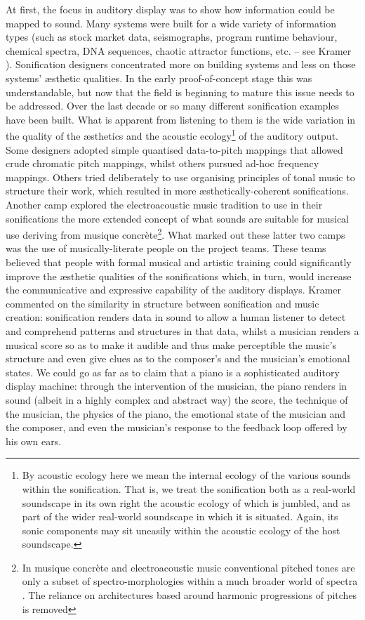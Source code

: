 \documentclass{article}
\begin{document}
At first, the focus in auditory display was to show how information could be mapped to sound. Many systems were built for a wide variety of information types (such as stock market data, seismographs, program runtime behaviour, chemical spectra, DNA sequences, chaotic attractor functions, etc. -- see Kramer \cite{Kramer:1994c}). Sonification designers concentrated more on building systems and less on those systems' æsthetic qualities. In the early proof-of-concept stage this was understandable, but now that the field is beginning to mature this issue needs to be addressed. Over the last decade or so many different sonification examples have been built. What is apparent from listening to them is the wide variation in the quality of the æsthetics and the acoustic ecology\footnote{By acoustic ecology here we mean the internal ecology of the various sounds within the sonification. That is, we treat the sonification both as a real-world soundscape in its own right the acoustic ecology of which is jumbled, and as part of the wider real-world soundscape in which it is situated. Again, its sonic components may sit uneasily within the acoustic ecology of the host soundscape.} of the auditory output. Some designers adopted simple quantised data-to-pitch mappings that allowed crude chromatic pitch mappings, whilst others pursued ad-hoc frequency mappings. Others tried deliberately to use organising principles of tonal music to structure their work, which resulted in more æsthetically-coherent sonifications. Another camp explored the electroacoustic music tradition to use in their sonifications the more extended concept of what sounds are suitable for musical use deriving from musique concrète\footnote{In musique concrète and electroacoustic music conventional pitched tones are only a subset of spectro-morphologies within a much broader world of spectra \cite{Smalley:1986}. The reliance on architectures based around harmonic progressions of pitches is removed}. What marked out these latter two camps was the use of musically-literate people on the project teams. These teams believed that people with formal musical and artistic training could significantly improve the æsthetic qualities of the sonifications which, in turn, would increase the communicative and expressive capability of the auditory displays. Kramer \cite{Kramer:1994b} commented on the similarity in structure between sonification and music creation: sonification renders data in sound to allow a human listener to detect and comprehend patterns and structures in that data, whilst a musician renders a musical score so as to make it audible and thus make perceptible the music's structure and even give clues as to the composer's and the musician's emotional states. We could go as far as to claim that a piano is a sophisticated auditory display machine: through the intervention of the musician, the piano renders in sound (albeit in a highly complex and abstract way) the score, the technique of the musician, the physics of the piano, the emotional state of the musician and the composer, and even the musician's response to the feedback loop offered by his own ears.
\end{document}
